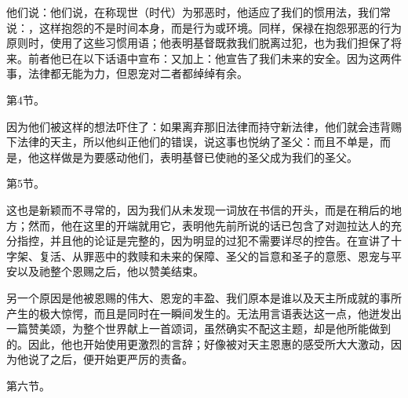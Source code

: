 他们说：他们说，在称现世（时代）为邪恶时，他适应了我们的惯用法，我们常说：，这样抱怨的不是时间本身，而是行为或环境。同样，保禄在抱怨邪恶的行为原则时，使用了这些习惯用语；他表明基督既救我们脱离过犯，也为我们担保了将来。前者他已在以下话语中宣布：又加上：他宣告了我们未来的安全。因为这两件事，法律都无能为力，但恩宠对二者都绰绰有余。\par

第4节。\par

因为他们被这样的想法吓住了：如果离弃那旧法律而持守新法律，他们就会违背赐下法律的天主，所以他纠正他们的错误，说这事也悦纳了圣父：而且不单是，而是，他这样做是为要感动他们，表明基督已使祂的圣父成为我们的圣父。\par

第5节。\par

这也是新颖而不寻常的，因为我们从未发现一词放在书信的开头，而是在稍后的地方；然而，他在这里的开端就用它，表明他先前所说的话已包含了对迦拉达人的充分指控，并且他的论证是完整的，因为明显的过犯不需要详尽的控告。在宣讲了十字架、复活、从罪恶中的救赎和未来的保障、圣父的旨意和圣子的意愿、恩宠与平安以及祂整个恩赐之后，他以赞美结束。\par

另一个原因是他被恩赐的伟大、恩宠的丰盈、我们原本是谁以及天主所成就的事所产生的极大惊愕，而且是同时在一瞬间发生的。无法用言语表达这一点，他迸发出一篇赞美颂，为整个世界献上一首颂词，虽然确实不配这主题，却是他所能做到的。因此，他也开始使用更激烈的言辞；好像被对天主恩惠的感受所大大激动，因为他说了之后，便开始更严厉的责备。\par

第六节。\par

